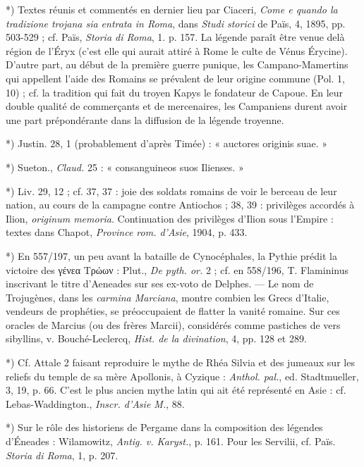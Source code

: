 \documentclass[a4paper, 11pt, oneside, polutonikogreek, french]{article}
\begin{document}
*) Textes réunis et commentés en dernier lieu par Ciaceri, \emph{Come e quando la tradizione trojana sia entrata in Roma}, dans \emph{Studi storici} de Païs, 4, 1895, pp. 503-529 ; cf. Païs, \emph{Storia di Roma}, 1. p. 157. La légende paraît être venue delà région de l'Éryx (c'est elle qui aurait attiré à Rome le culte de Vénus Érycine). D'autre part, au début de la première guerre punique, les Campano-Mamertins qui appellent l'aide des Romains se prévalent de leur origine commune (Pol. 1, 10) ; cf. la tradition qui fait du troyen Kapys le fondateur de Capoue. En leur double qualité de commerçants et de mercenaires, les Campaniens durent avoir une part prépondérante dans la diffusion de la légende troyenne.

*) Justin. 28, 1 (probablement d'après Timée) : « auctores originis suae. »

*) Sueton., \emph{Claud.} 25 : « consanguineos suos Ilienses. »

*) Liv.  29, 12 ; cf. 37, 37 : joie des soldats romains de voir le berceau de leur nation, au cours de la campagne contre Antiochos ; 38, 39 : privilèges accordés à Ilion, \emph{originum memoria}. Continuation des privilèges d'Ilion sous l'Empire : textes dans Chapot, \emph{Province rom. d'Asie}, 1904, p. 433.

*) En 557/197, un peu avant la bataille de Cynocéphales, la Pythie prédit la victoire des γένεα Τρώων : Plut., \emph{De pyth. or.} 2 ; cf. en 558/196, T. Flamininus inscrivant le titre d'Aeneades sur ses ex-voto de Delphes. --- Le nom de Trojugènes, dans les \emph{carmina Marciana}, montre combien les Grecs d'Italie, vendeurs de prophéties, se préoccupaient de flatter la vanité romaine. Sur ces oracles de Marcius (ou des frères Marcii), considérés comme pastiches de vers sibyllins, v. Bouché-Leclercq, \emph{Hist. de la divination}, 4, pp. 128 et 289.

*) Cf. Attale 2 faisant reproduire le mythe de Rhéa Silvia et des jumeaux sur les reliefs du temple de sa mère Apollonis, à Cyzique : \emph{Anthol. pal.}, ed. Stadtmueller, 3, 19, p. 66. C'est le plus ancien mythe latin qui ait été représenté en Asie : cf. Lebas-Waddington., \emph{Inscr. d'Asie M.}, 88.

*) Sur le rôle des historiens de Pergame dans la composition des légendes d'Éneades : Wilamowitz, \emph{Antig. v. Karyst.}, p. 161. Pour les Servilii, cf. Païs. \emph{Storia di Roma}, 1, p. 207.
\end{document}

